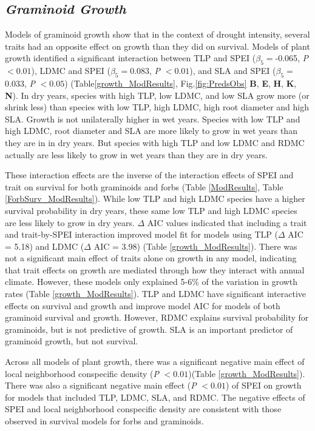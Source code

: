 \documentclass[12pt, letterpaper]{article}
\begin{document}
\subsection{\textit{Graminoid Growth}} Models of graminoid growth show that in the context of drought intensity, several traits had an opposite effect on growth than they did on survival. Models of plant growth identified a significant interaction between TLP and SPEI ($\beta _5=$-0.065,  \textit{P} $<0.01$), LDMC and SPEI ($\beta _5=$0.083,  \textit{P} $<0.01$), and SLA and SPEI ($\beta _5=$0.033,  \textit{P} $<0.05$) (Table\ref{growth_ModResults}, Fig.\ref{fig:PredsObs} \textbf{B}, \textbf{E}, \textbf{H}, \textbf{K}, \textbf{N}). In dry years, species with high TLP, low LDMC, and low SLA grow more (or shrink less) than species with low TLP, high LDMC, high root diameter and high SLA. Growth is not unilaterally higher in wet years. Species with low TLP and high LDMC, root diameter and SLA are more likely to grow in wet years than they are in in dry years. But species with high TLP and low LDMC and RDMC actually are less likely to grow in wet years than they are in dry years. 

These interaction effects are the inverse of the interaction effects of SPEI and trait on survival for both graminoids and forbs (Table \ref{ModResults}, Table \ref{ForbSurv_ModResults}). While low TLP and high LDMC species have a higher survival probability in dry years, these same low TLP and high LDMC species are less likely to grow in dry years. $\Delta$ AIC values indicated that including a trait and trait-by-SPEI interaction improved model fit for models using TLP ($\Delta$ AIC = 5.18) and LDMC ($\Delta$ AIC = 3.98) (Table \ref{growth_ModResults}). There was not a significant main effect of traits alone on growth in any model, indicating that trait effects on growth are mediated through how they interact with annual climate. However, these models only explained 5-6\% of the variation in growth rates (Table \ref{growth_ModResults}). TLP and LDMC have significant interactive effects on survival and growth and improve model AIC for models of both graminoid survival and growth. However, RDMC explains survival probability for graminoids, but is not predictive of growth. SLA is an important predictor of graminoid growth, but not survival. 

 Across all models of plant growth, there was a significant negative main effect of local neighborhood conspecific density (\textit{P} $<0.01$)(Table \ref{growth_ModResults}). There was also a significant negative main effect (\textit{P} $<0.01$) of SPEI on growth for models that included TLP, LDMC, SLA, and RDMC. The negative effects of SPEI and local neighborhood conspecific density are consistent with those observed in survival models for forbs and graminoids.
\end{document}
